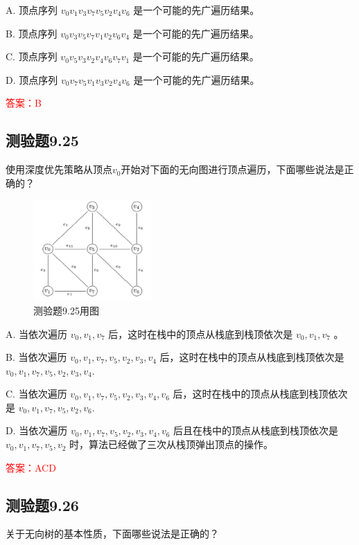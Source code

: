 \documentclass[UTF8, heading=true]{ctexart}
\begin{document}
A. 顶点序列 $v_0 v_1 v_3 v_7 v_5 v_2 v_4 v_6$ 是一个可能的先广遍历结果。

B. 顶点序列 $v_0 v_3 v_5 v_7 v_1 v_2 v_6 v_4$ 是一个可能的先广遍历结果。

C. 顶点序列 $v_0 v_5 v_3 v_2 v_4 v_6 v_7 v_1$ 是一个可能的先广遍历结果。

D. 顶点序列 $v_0 v_7 v_5 v_1 v_3 v_2 v_4 v_6$ 是一个可能的先广遍历结果。

\textcolor{red}{答案：B}

\subsection{测验题9.25}

使用深度优先策略从顶点$v_0$开始对下面的无向图进行顶点遍历，下面哪些说法是正确的？

\begin{figure}[H]
  \centering
  \includegraphics[width=0.4\textwidth]{9.24.jpg} %
  \caption{测验题9.25用图}
\end{figure}

A. 当依次遍历 $v_0, v_1, v_7$ 后，这时在栈中的顶点从栈底到栈顶依次是 $v_0, v_1, v_7$ 。

B. 当依次遍历 $v_0, v_1, v_7, v_5, v_2, v_3, v_4$ 后，这时在栈中的顶点从栈底到栈顶依次是 $v_0, v_1, v_7, v_5, v_2, v_3, v_4$.

C. 当依次遍历 $v_0, v_1, v_7, v_5, v_2, v_3, v_4, v_6$ 后，这时在栈中的顶点从栈底到栈顶依次是 $v_0, v_1, v_7, v_5, v_2, v_6$.

D. 当依次遍历 $v_0, v_1, v_7, v_5, v_2, v_3, v_4, v_6$ 后且在栈中的顶点从栈底到栈顶依次是 $v_0, v_1, v_7, v_5, v_2$ 时，算法已经做了三次从栈顶弹出顶点的操作。

\textcolor{red}{答案：ACD}

\subsection{测验题9.26}

关于无向树的基本性质，下面哪些说法是正确的？
\end{document}
